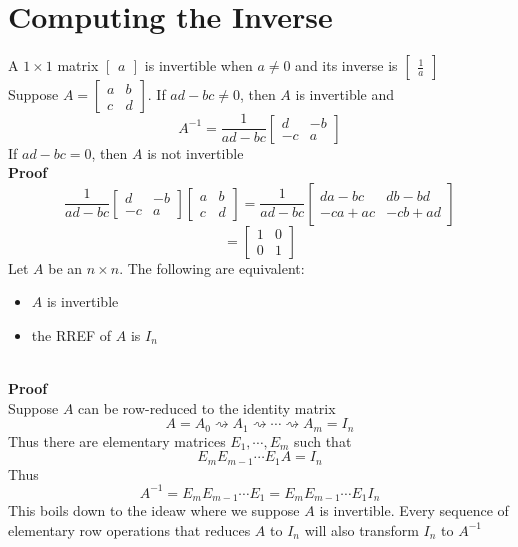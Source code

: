 \section{Computing the Inverse}
A $1 \times 1$ matrix $\begin{bmatrix}
  a
\end{bmatrix}$ is invertible when $a \neq 0$ and its inverse is 
$\begin{bmatrix}
  \frac{1}{a}
\end{bmatrix}$
\\[8pt]
Suppose $A = \begin{bmatrix}
  a & b \\
  c & d
\end{bmatrix}$. If $ad - bc \neq 0$, then $A$ is invertible and 
\[
  A^{-1} = \frac{1}{ad - bc} \begin{bmatrix}
    d & -b \\
    -c & a
  \end{bmatrix}
\]
If $ad - bc = 0$, then $A$ is not invertible 
\\[8pt]
\textbf{Proof}
\\[8pt]
\[
  \frac{1}{ad - bc} \begin{bmatrix}
    d & -b \\
    -c & a
  \end{bmatrix} \begin{bmatrix}
    a & b \\
    c & d
  \end{bmatrix} = \frac{1}{ad - bc} \begin{bmatrix}
    da - bc & db - bd \\
    -ca + ac & -cb + ad
  \end{bmatrix} 
\]
\[
  = \begin{bmatrix}
    1 & 0 \\
    0 & 1
  \end{bmatrix}
\]
Let $A$ be an $n \times n$. The following are equivalent:
\begin{itemize}
  \item $A$ is invertible
  \item the RREF of $A$ is $I_n$
\end{itemize}
\\[8pt]
\textbf{Proof}
\\[8pt]
Suppose $A$ can be row-reduced to the identity matrix 
\[
  A = A_0 \rightsquigarrow A_1 \rightsquigarrow \cdots \rightsquigarrow
  A_m = I_n
\]
Thus there are elementary matrices $E_1, \cdots, E_m$ such that 
\[
  E_mE_{m-1} \cdots E_1A = I_n
\]
Thus 
\[
  A^{-1} = E_mE_{m - 1}\cdots E_1 = E_mE_{m - 1} \cdots E_1I_n
\]
This boils down to the ideaw where we suppose $A$ is invertible. Every sequence of 
elementary row operations that reduces $A$ to $I_n$ will also transform $I_n$ to 
$A^{-1}$
